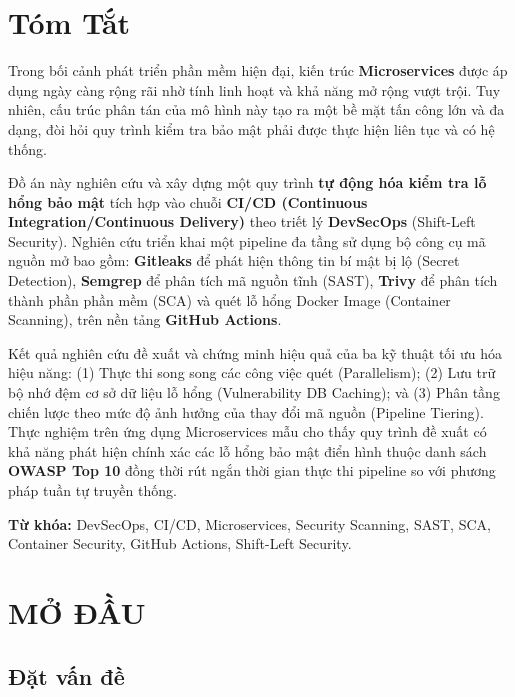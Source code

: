 \documentclass[12pt,a4paper]{report}
\begin{document}
\chapter*{Tóm Tắt}

Trong bối cảnh phát triển phần mềm hiện đại, kiến trúc \textbf{Microservices} được áp dụng ngày càng rộng rãi nhờ tính linh hoạt và khả năng mở rộng vượt trội. Tuy nhiên, cấu trúc phân tán của mô hình này tạo ra một bề mặt tấn công lớn và đa dạng, đòi hỏi quy trình kiểm tra bảo mật phải được thực hiện liên tục và có hệ thống.

Đồ án này nghiên cứu và xây dựng một quy trình \textbf{tự động hóa kiểm tra lỗ hổng bảo mật} tích hợp vào chuỗi \textbf{CI/CD (Continuous Integration/Continuous Delivery)} theo triết lý \textbf{DevSecOps} (Shift-Left Security). Nghiên cứu triển khai một pipeline đa tầng sử dụng bộ công cụ mã nguồn mở bao gồm: \textbf{Gitleaks} để phát hiện thông tin bí mật bị lộ (Secret Detection), \textbf{Semgrep} để phân tích mã nguồn tĩnh (SAST), \textbf{Trivy} để phân tích thành phần phần mềm (SCA) và quét lỗ hổng Docker Image (Container Scanning), trên nền tảng \textbf{GitHub Actions}.

Kết quả nghiên cứu đề xuất và chứng minh hiệu quả của ba kỹ thuật tối ưu hóa hiệu năng: (1) Thực thi song song các công việc quét (Parallelism); (2) Lưu trữ bộ nhớ đệm cơ sở dữ liệu lỗ hổng (Vulnerability DB Caching); và (3) Phân tầng chiến lược theo mức độ ảnh hưởng của thay đổi mã nguồn (Pipeline Tiering). Thực nghiệm trên ứng dụng Microservices mẫu cho thấy quy trình đề xuất có khả năng phát hiện chính xác các lỗ hổng bảo mật điển hình thuộc danh sách \textbf{OWASP Top 10} đồng thời rút ngắn thời gian thực thi pipeline so với phương pháp tuần tự truyền thống.

\bigskip
\noindent\textbf{Từ khóa:} DevSecOps, CI/CD, Microservices, Security Scanning, SAST, SCA, Container Security, GitHub Actions, Shift-Left Security.

\tableofcontents


\chapter{MỞ ĐẦU}

\section{Đặt vấn đề}
\end{document}
